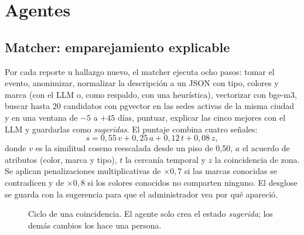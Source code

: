 \documentclass[conference]{IEEEtran}
\begin{document}
\section{Agentes}

\subsection{Matcher: emparejamiento explicable}
Por cada reporte u hallazgo nuevo, el matcher ejecuta ocho pasos: tomar el evento, anonimizar, normalizar la descripción a un JSON con tipo, colores y marca (con el LLM o, como respaldo, con una heurística), vectorizar con bge-m3, buscar hasta 20 candidatos con pgvector en las sedes activas de la misma ciudad y en una ventana de $-5$ a $+45$ días, puntuar, explicar las cinco mejores con el LLM y guardarlas como \emph{sugeridas}. El puntaje combina cuatro señales:
\begin{equation}
s = 0{,}55\,v + 0{,}25\,a + 0{,}12\,t + 0{,}08\,z,
\end{equation}
donde $v$ es la similitud coseno reescalada desde un piso de 0,50, $a$ el acuerdo de atributos (color, marca y tipo), $t$ la cercanía temporal y $z$ la coincidencia de zona. Se aplican penalizaciones multiplicativas de $\times 0{,}7$ si las marcas conocidas se contradicen y de $\times 0{,}8$ si los colores conocidos no comparten ninguno. El desglose se guarda con la sugerencia para que el administrador vea por qué apareció.

\begin{figure}[t]
\centering
{}
\caption{Ciclo de una coincidencia. El agente solo crea el estado \emph{sugerida}; los demás cambios los hace una persona.}
\label{fig:estados}
\end{figure}
\end{document}
